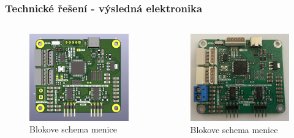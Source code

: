 \documentclass[%
  12pt,       				%
	t,                  %
	aspectratio=1610,   %
	unicode,						%
]{beamer}				    	%
\begin{document}
\begin{frame}
	\frametitle{Technické řešení - výsledná elektronika}
	\begin{columns}[T] 								%
		\begin{column}{0.5\textwidth}		%
			\begin{figure}%
				\centering	              %
				\includegraphics[width=0.8\columnwidth]{../Thesis/obrazky/pcb_rev2}
				\caption{Blokove schema menice}%
				\label{fig:sm4_block}
			\end{figure}
		\end{column}
		\begin{column}{0.5\textwidth}		%
			\begin{figure}%
				\centering
				\includegraphics[width=0.8\columnwidth]{../Thesis/obrazky/rev2}
				\caption{Blokove schema menice}%
				\label{fig:sm4_block}
			\end{figure}
		\end{column}
	\end{columns}
\end{frame}
\end{document}
